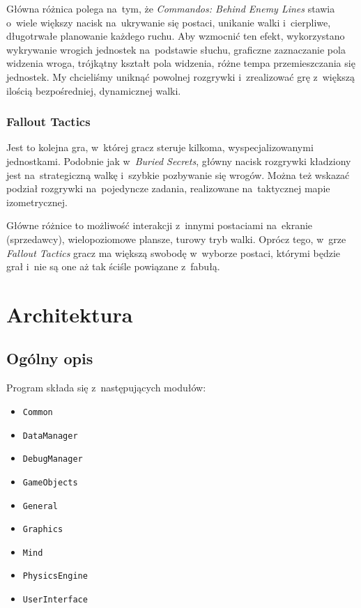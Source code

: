 \documentclass[licencjacka]{pracamgr}
\begin{document}
      Główna różnica polega na~tym, że \emph{Commandos: Behind Enemy Lines} stawia o~wiele większy nacisk na~ukrywanie się postaci, unikanie walki
      i~cierpliwe, długotrwałe planowanie każdego ruchu. Aby wzmocnić ten efekt, wykorzystano wykrywanie wrogich jednostek na~podstawie słuchu,
      graficzne zaznaczanie pola widzenia wroga, trójkątny kształt pola widzenia, różne tempa przemieszczania się jednostek.
      My chcieliśmy uniknąć powolnej rozgrywki i~zrealizować grę z~większą ilością bezpośredniej, dynamicznej walki.

    \subsection{Fallout Tactics}
      Jest to kolejna gra, w~której gracz steruje kilkoma, wyspecjalizowanymi jednostkami. Podobnie jak w~\emph{Buried Secrets}, główny nacisk rozgrywki
      kładziony jest na~strategiczną walkę i~szybkie pozbywanie się wrogów. Można też wskazać podział rozgrywki na~pojedyncze zadania,
      realizowane na~taktycznej mapie izometrycznej.

      Główne różnice to możliwość interakcji z~innymi postaciami na~ekranie (sprzedawcy), wielopoziomowe plansze, turowy tryb walki. Oprócz tego,
      w~grze \emph{Fallout Tactics} gracz ma większą swobodę w~wyborze postaci, którymi będzie grał i~nie są one aż tak ściśle powiązane z~fabułą.


\chapter{Architektura}
  \section{Ogólny opis}
    Program składa się z~następujących modułów:
    \begin{itemize}
      \item \texttt{Common}
      \item \texttt{DataManager}
      \item \texttt{DebugManager}
      \item \texttt{GameObjects}
      \item \texttt{General}
      \item \texttt{Graphics}
      \item \texttt{Mind}
      \item \texttt{PhysicsEngine}
      \item \texttt{UserInterface}
    \end{itemize}
\end{document}
